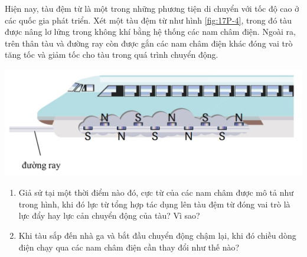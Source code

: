 \begin{ex}
Hiện nay, tàu đệm từ là một trong những phương tiện di chuyển với tốc độ cao ở các quốc gia phát triển. Xét một tàu đệm từ như hình \ref{fig:17P-4}, trong đó tàu được nâng lơ lửng trong không khí bằng hệ thống các nam châm điện. Ngoài ra, trên thân tàu và đường ray còn được gắn các nam châm điện khác đóng vai trò tăng tốc và giảm tốc cho tàu trong quá trình chuyển động.
\begin{center}
	\includegraphics[width=0.6\linewidth]{../figs/VN12-Y24-PH-SYL-017P-4}
	\label{fig:17P-4}
\end{center}	
\begin{enumerate}[label=\alph*)]
	\item Giả sử tại một thời điểm nào đó, cực từ của các nam châm được mô tả như trong hình, khi đó lực từ tổng hợp tác dụng lên tàu đệm từ đóng vai trò là lực đẩy hay lực cản chuyển động của tàu? Vì sao?
	\item Khi tàu sắp đến nhà ga và bắt đầu chuyển động chậm lại, khi đó chiều dòng điện chạy qua các nam châm điện cần thay đổi như thế nào?
\end{enumerate}
\end{ex}
